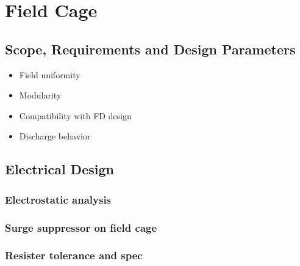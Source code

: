 



\section{Field Cage}

\subsection{Scope, Requirements and Design Parameters}
\begin{itemize}
\item Field uniformity
\item Modularity
\item Compatibility with FD design
\item Discharge behavior
\end{itemize}

\subsection{Electrical Design}

\subsubsection{Electrostatic analysis}

\subsubsection{Surge suppressor on field cage}

\subsubsection{Resister tolerance and spec}

